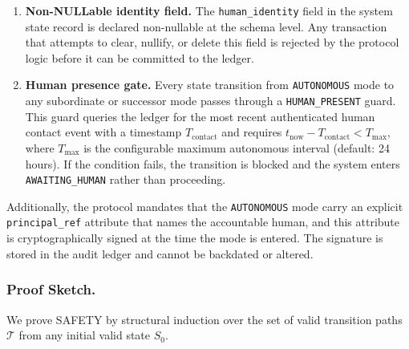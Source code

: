 \begin{enumerate}
    \item \textbf{Non-NULLable identity field.} The \texttt{human\_identity} field in the system state record is declared non-nullable at the schema level. Any transaction that attempts to clear, nullify, or delete this field is rejected by the protocol logic before it can be committed to the ledger.
    \item \textbf{Human presence gate.} Every state transition from \texttt{AUTONOMOUS} mode to any subordinate or successor mode passes through a \texttt{HUMAN\_PRESENT} guard. This guard queries the ledger for the most recent authenticated human contact event with a timestamp $T_{\text{contact}}$ and requires $t_{\text{now}} - T_{\text{contact}} < T_{\max}$, where $T_{\max}$ is the configurable maximum autonomous interval (default: 24 hours). If the condition fails, the transition is blocked and the system enters \texttt{AWAITING\_HUMAN} rather than proceeding.
\end{enumerate}

Additionally, the protocol mandates that the \texttt{AUTONOMOUS} mode carry an explicit \texttt{principal\_ref} attribute that names the accountable human, and this attribute is cryptographically signed at the time the mode is entered. The signature is stored in the audit ledger and cannot be backdated or altered.

\subsubsection*{Proof Sketch.}
We prove SAFETY by structural induction over the set of valid transition paths $\mathcal{T}$ from any initial valid state $S_0$.

